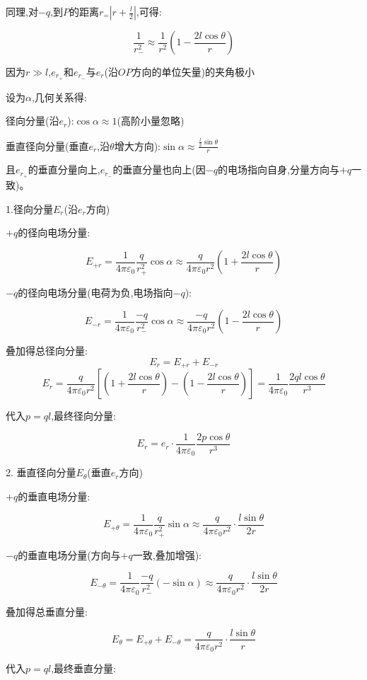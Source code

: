 \documentclass{article}
\begin{document}
同理,对$-q$,到$P$的距离$r_= \left|r+\frac{l}{2}\right|$,可得:

$$\frac{1}{r_-^2}\approx\frac{1}{r^2}\left(1-\frac{2l\cos\theta}{r}\right)$$

因为$r\gg l$,$e_{r_+}$和$e_{r_-}$与$e_r$(沿$OP$方向的单位矢量)的夹角极小

设为$\alpha$,几何关系得:

径向分量(沿$e_r$):$\cos\alpha\approx1$(高阶小量忽略)

垂直径向分量(垂直$e_r$,沿$\theta$增大方向):$\sin\alpha\approx\frac{\frac{l}{2}\sin\theta}{r}$

且$e_{r_+}$的垂直分量向上,$e_{r_-}$的垂直分量也向上(因$-q$的电场指向自身,分量方向与$+q$一致)。

1.径向分量$E_r$(沿$e_r$方向)

$+q$的径向电场分量:

$$E_{+r}=\frac{1}{4\pi\varepsilon_0}\frac{q}{r_+^2}\cos\alpha\approx\frac{q}{4\pi\varepsilon_0 r^2}\left(1+\frac{2l\cos\theta}{r}\right)$$

$-q$的径向电场分量(电荷为负,电场指向$-q$):

$$E_{-r}=\frac{1}{4\pi\varepsilon_0}\frac{-q}{r_-^2}\cos\alpha\approx\frac{-q}{4\pi\varepsilon_0 r^2}\left(1-\frac{2l\cos\theta}{r}\right)$$

叠加得总径向分量:
$$E_r = E_{+r}+E_{-r} $$
$$E_r=\frac{q}{4\pi\varepsilon_0 r^2}\left[\left(1+\frac{2l\cos\theta}{r}\right)-\left(1-\frac{2l\cos\theta}{r}\right)\right] =\frac{1}{4\pi\varepsilon_0}\frac{2ql\cos\theta}{r^3}$$

代入$p=ql$,最终径向分量:

$$E_r = e_r \cdot \frac{1}{4\pi\varepsilon_0}\frac{2p\cos\theta}{r^3}$$

2. 垂直径向分量$E_\theta$(垂直$e_r$方向)

$+q$的垂直电场分量:

$$E_{+\theta}=\frac{1}{4\pi\varepsilon_0}\frac{q}{r_+^2}\sin\alpha\approx\frac{q}{4\pi\varepsilon_0 r^2}\cdot\frac{l\sin\theta}{2r}$$

$-q$的垂直电场分量(方向与$+q$一致,叠加增强):

$$E_{-\theta}=\frac{1}{4\pi\varepsilon_0}\frac{-q}{r_-^2}(-\sin\alpha)\approx\frac{q}{4\pi\varepsilon_0 r^2}\cdot\frac{l\sin\theta}{2r}$$

叠加得总垂直分量:

$$E_\theta = E_{+\theta}+E_{-\theta} =\frac{q}{4\pi\varepsilon_0 r^2}\cdot\frac{l\sin\theta}{r}$$

代入$p=ql$,最终垂直分量:
\end{document}
